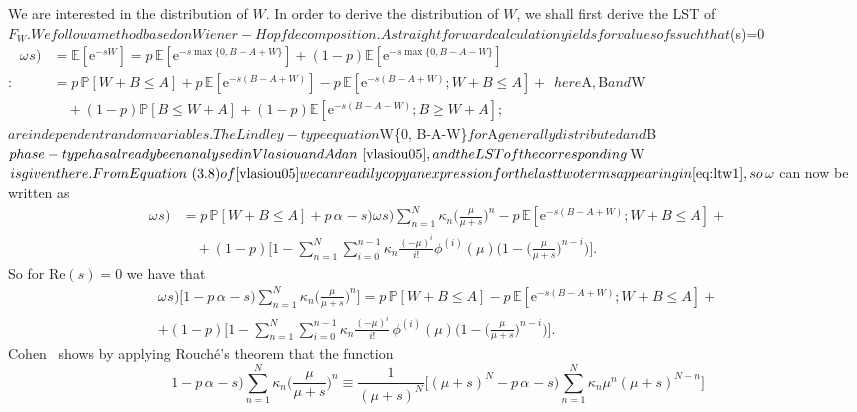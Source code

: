 \documentclass[reqno, 11pt, a4paper]{article}
\theoremstyle{plain}
\theoremstyle{remark}
\numberwithin{equation}{section}
\begin{document}
We are interested in the distribution of $W$. In order to derive the distribution of $W$, we shall first derive the LST of ${\mbox{$F_W^{}$}}. We follow a method based on Wiener-Hopf decomposition. A straightforward calculation yields for values of $s$ such that $(s)=0$:
\begin{align}
\nonumber {\mbox{$\omega^{}$}}s)&={\mathbb{E}}[\mathrm{e}^{-sW}]=p\,{\mathbb{E}}[\mathrm{e}^{-s\max\{0, B-A+W\}}]+(1-p){\mathbb{E}}[\mathrm{e}^{-s\max\{0, B-A-W\}}]\\
\nonumber        &=p\,{\mathbb{P}}[W+B\leqslant A]+p\,{\mathbb{E}}[\mathrm{e}^{-s(B-A+W)}]-p\,{\mathbb{E}}[\mathrm{e}^{-s(B-A+W)};W+B\leqslant A]+\\
\label{eq:ltw1}  &\quad +(1-p) {\mathbb{P}}[B\leqslant W+A]+(1-p){\mathbb{E}}[\mathrm{e}^{-s(B-A-W)};B\geqslant W+A];
\end{align}
here $A$, $B$ and $W$ are independent random variables. The Lindley-type equation $W\max\{0, B-A-W\}$ for $A$ generally distributed and $B$ phase-type has already been analysed in Vlasiou and Adan~\cite{vlasiou05}, and the LST of the corresponding $W$ is given there. From Equation~(3.8) of \cite{vlasiou05} we can readily copy an expression for the last two terms appearing in \eqref{eq:ltw1}, so ${\mbox{$\omega^{}$}} can now be written as
\begin{align*}
{\mbox{$\omega^{}$}}s)&=p\,{\mathbb{P}}[W+B\leqslant A]+p\,{\mbox{$\alpha^{}$}}-s){\mbox{$\omega^{}$}}s)\sum_{n=1}^N \kappa_n\biggl(\frac{\mu}{\mu+s}\biggr)^n -p\,{\mathbb{E}}[\mathrm{e}^{-s(B-A+W)};W+B \leqslant A]+\\
        &\quad +(1-p)\Biggl[1-\sum_{n=1}^N \sum_{i=0}^{n-1} \kappa_n \frac{(-\mu)^i}{i!} \phi^{(i)}(\mu)\biggl(1-\biggl( \frac{\mu}{\mu+s}\biggr)^{n-i} \biggr)\Biggr].
\end{align*}
So for $\mathrm{Re}(s)=0$ we have that
\begin{multline}\label{eq:transform1}
{\mbox{$\omega^{}$}}s)\Biggl[1-p\,{\mbox{$\alpha^{}$}}-s)\sum_{n=1}^N \kappa_n\biggl(\frac{\mu}{\mu+s}\biggr)^n  \Biggr]=p\,{\mathbb{P}}[W+B\leqslant A]-p\,{\mathbb{E}}[\mathrm{e}^{-s(B-A+W)};W+B\leqslant A]+\\
        +(1-p)\Biggl[1-\sum_{n=1}^N \sum_{i=0}^{n-1} \kappa_n \frac{(-\mu)^i}{i!}\, \phi^{(i)}(\mu) \biggl(1 - \biggl(\frac{\mu}{\mu+s}\biggr)^{n-i} \biggr)\Biggr].
\end{multline}
Cohen~\cite[p.\ 322--323]{cohen-SSQ} shows by applying Rouch\'{e}'s theorem that the function
$$
1-p\,{\mbox{$\alpha^{}$}}-s)\sum_{n=1}^N \kappa_n\biggl(\frac{\mu}{\mu+s}\biggr)^n \equiv \frac{1}{(\mu+s)^N}\biggl[(\mu+s)^N-p\,{\mbox{$\alpha^{}$}}-s)\sum_{n=1}^N \kappa_n \mu^n(\mu+s)^{N-n}\biggr]
$$
\end{document}

